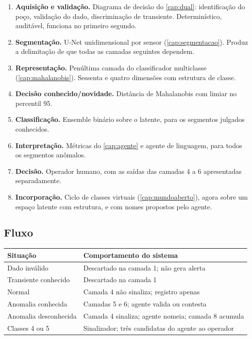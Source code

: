 \begin{enumerate}[leftmargin=*,itemsep=0.4em]

\item \textbf{Aquisição e validação.} Diagrama de decisão do \cref{cap:dual}:
identificação do poço, validação do dado, discriminação de transiente. Determinístico,
auditável, funciona no primeiro segundo.

\item \textbf{Segmentação.} U-Net unidimensional por sensor (\cref{cap:segmentacao}).
Produz a delimitação de que todas as camadas seguintes dependem.

\item \textbf{Representação.} Penúltima camada do classificador multiclasse
(\cref{cap:mahalanobis}). Sessenta e quatro dimensões com estrutura de classe.

\item \textbf{Decisão conhecido/novidade.} Distância de Mahalanobis com limiar no
percentil 95.

\item \textbf{Classificação.} Ensemble binário sobre o latente, para os segmentos
julgados conhecidos.

\item \textbf{Interpretação.} Métricas do \cref{cap:agente} e agente de linguagem, para
todos os segmentos anômalos.

\item \textbf{Decisão.} Operador humano, com as saídas das camadas 4 a 6 apresentadas
separadamente.

\item \textbf{Incorporação.} Ciclo de classes virtuais (\cref{cap:mundoaberto}), agora
sobre um espaço latente com estrutura, e com nomes propostos pelo agente.

\end{enumerate}

\subsection{Fluxo}

\begin{center}
\small
\begin{tabular}{ll}
\toprule
\textbf{Situação} & \textbf{Comportamento do sistema} \\
\midrule
Dado inválido & Descartado na camada 1; não gera alerta \\
Transiente conhecido & Descartado na camada 1 \\
Normal & Camada 4 não sinaliza; registro apenas \\
Anomalia conhecida & Camadas 5 e 6; agente valida ou contesta \\
Anomalia desconhecida & Camada 4 sinaliza; agente nomeia; camada 8 acumula \\
Classes 4 ou 5 & Sinalizador; três candidatas do agente ao operador \\
\bottomrule
\end{tabular}
\end{center}

